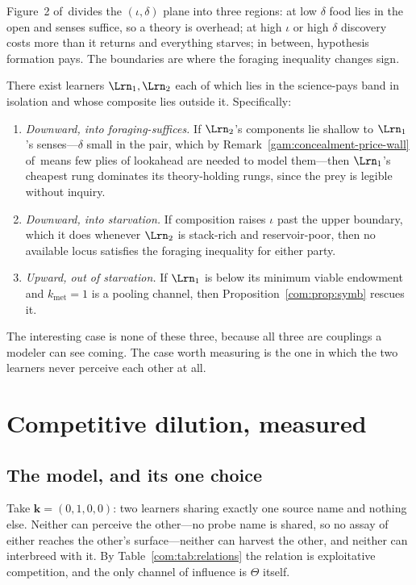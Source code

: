 Figure~2 of~\chSci divides the $(\iota,\delta)$ plane into three regions: at low $\delta$
food lies in the open and senses suffice, so a theory is overhead; at high $\iota$ or high
$\delta$ discovery costs more than it returns and everything starves; in between, hypothesis
formation pays. The boundaries are where the foraging inequality changes sign.

\begin{proposition}\label{com:prop:phase}
There exist learners $\Lrn_1, \Lrn_2$ each of which lies in the science-pays band in isolation
and whose composite lies outside it. Specifically:
\begin{enumerate}[label=(\alph*)]
\item \emph{Downward, into foraging-suffices.} If $\Lrn_2$'s components lie shallow to $\Lrn_1$'s
senses---$\delta$ small in the pair, which by Remark~\ref{gam:concealment-price-wall} of~\chGame means few plies of
lookahead are needed to model them---then $\Lrn_1$'s cheapest rung dominates its theory-holding
rungs, since the prey is legible without inquiry.
\item \emph{Downward, into starvation.} If composition raises $\iota$ past the upper boundary,
which it does whenever $\Lrn_2$ is stack-rich and reservoir-poor, then no available locus
satisfies the foraging inequality for either party.
\item \emph{Upward, out of starvation.} If $\Lrn_1$ is below its minimum viable endowment and
$k_{\mathrm{met}}=1$ is a pooling channel, then Proposition~\ref{com:prop:symb} rescues it.
\end{enumerate}
\end{proposition}

The interesting case is none of these three, because all three are couplings a modeler can see
coming. The case worth measuring is the one in which the two learners never perceive each other
at all.

\section{Competitive dilution, measured}\label{com:sec:dilution}\label{com:S10}

\subsection{The model, and its one choice}\label{com:S10.1}

Take $\mathbf{k} = (0,1,0,0)$: two learners sharing exactly one source name and nothing else.
Neither can perceive the other---no probe name is shared, so no assay of either reaches the
other's surface---neither can harvest the other, and neither can interbreed with it. By
Table~\ref{com:tab:relations} the relation is exploitative competition, and the only channel of
influence is $\Theta$ itself.

